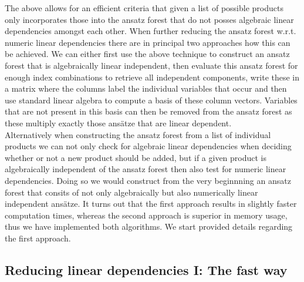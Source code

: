 \documentclass[a4paper,12pt, DIV=14, BCOR=5mm, twoside, headsepline, numbers=noenddot]{scrbook}
\begin{document}
The above allows for an efficient criteria that given a list of possible products only incorporates those into the ansatz forest that do not posses algebraic linear dependencies amongst each other. When further reducing the ansatz forest w.r.t. numeric linear dependencies there are in principal two approaches how this can be achieved. We can either first use the above technique to construct an ansatz forest that is algebraically linear independent, then evaluate this ansatz forest for enough index combinations to retrieve all independent components, write these in a matrix where the columns label the individual variables that occur and then use standard linear algebra to compute a basis of these column vectors. Variables that are not present in this basis can then be removed from the ansatz forest as these multiply exactly those ansätze that are linear dependent. \\

Alternatively when constructing the ansatz forest from a list of individual products we can not only check for algebraic linear dependencies when deciding whether or not a new product should be added, but if a given product is algebraically independent of the  ansatz forest then also test for numeric linear dependencies. Doing so we would construct from the very beginnning an ansatz forest that consits of not only algebraically but also numerically linear independent ansätze.
It turns out that the first approach results in slightly faster computation times, whereas the second approach is superior in memory usage, thus we have implemented both algorithms. 
We start provided details regarding the first approach. \\

\subsection*{Reducing linear dependencies I:  The fast way}
\end{document}
